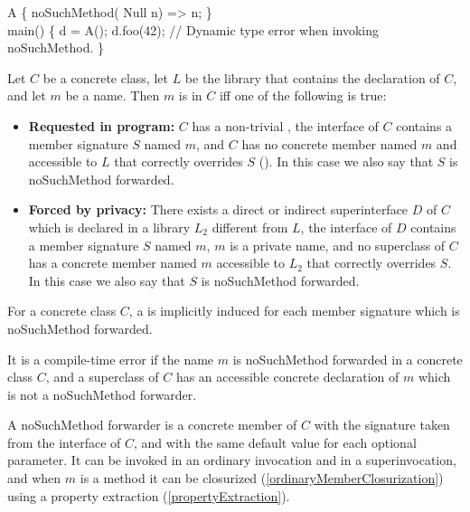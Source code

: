 \documentclass[makeidx]{article}
\begin{document}
\begin{dartCode}
\CLASS{} A \{
  noSuchMethod(\COVARIANT{} Null n) => n;
\}
\\
\VOID{} main() \{
  \DYNAMIC{} d = A();
  d.foo(42); // Dynamic type error when invoking noSuchMethod.
\}
\end{dartCode}

\LMHash{}%
Let $C$ be a concrete class,
let $L$ be the library that contains the declaration of $C$,
and let $m$ be a name.
Then $m$ is  in $C$ if{}f
one of the following is true:

\begin{itemize}
\item \textbf{Requested in program:}
  $C$ has a non-trivial ,
  the interface of $C$ contains a member signature $S$ named $m$,
  and $C$ has no concrete member named $m$ and accessible to $L$
  that correctly overrides $S$
  ().
  In this case we also say that $S$ is noSuchMethod forwarded.
\item
  \textbf{Forced by privacy:}
  There exists a direct or indirect superinterface
  $D$ of $C$ which is declared in a library $L_2$ different from $L$,
  the interface of $D$ contains a member signature $S$ named $m$,
  $m$ is a private name,
  and no superclass of $C$ has
  a concrete member named $m$ accessible to $L_2$
  that correctly overrides $S$.
  In this case we also say that $S$ is noSuchMethod forwarded.
\end{itemize}

\LMHash{}%
For a concrete class $C$, a
is implicitly induced for each member signature
which is noSuchMethod forwarded.

\LMHash{}%
It is a compile-time error if the name $m$ is noSuchMethod forwarded
in a concrete class $C$,
and a superclass of $C$ has an accessible concrete declaration of $m$
which is not a noSuchMethod forwarder.

\LMHash{}%
A noSuchMethod forwarder is a concrete member of $C$
with the signature taken from the interface of $C$,
and with the same default value for each optional parameter.
It can be invoked in an ordinary invocation and in a superinvocation,
and when $m$ is a method it can be closurized
(\ref{ordinaryMemberClosurization})
using a property extraction
(\ref{propertyExtraction}).
\end{document}
